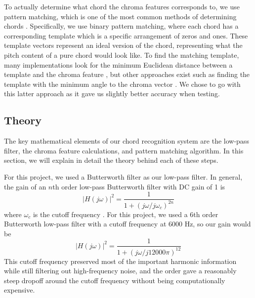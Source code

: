 \documentclass[journal]{IEEEtran}
\begin{document}
To actually determine what chord the chroma features corresponds to, we use pattern matching, which is one of the most common methods of determining chords \cite{cho_chroma}.
Specifically, we use binary pattern matching, where each chord has a corresponding template which is a specific arrangement of zeros and ones.
These template vectors represent an ideal version of the chord, representing what the pitch content of a pure chord would look like.
To find the matching template, many implementations look for the minimum Euclidean distance between a template and the chroma feature \cite{stark}, but other approaches exist such as finding the template with the minimum angle to the chroma vector \cite{jiang}.
We chose to go with this latter approach as it gave us slightly better accuracy when testing.


\subsection{Theory}
The key mathematical elements of our chord recognition system are the low-pass filter, the chroma feature calculations, and pattern matching algorithm.
In this section, we will explain in detail the theory behind each of these steps.

For this project, we used a Butterworth filter as our low-pass filter.
In general, the gain of an $n$th order low-pass Butterworth filter with DC gain of 1 is 
\begin{equation}
    |H(j\omega)|^2 = \frac{1}{1 + (j\omega/j\omega_c)^{2n}}
    \label{eq:butterworth}
\end{equation}
where $\omega_c$ is the cutoff frequency \cite{proakis}.
For this project, we used a 6th order Butterworth low-pass filter with a cutoff frequency at 6000 Hz, so our gain would be
\begin{equation*}
    |H(j\omega)|^2 = \frac{1}{1 + (j\omega/j12000\pi)^{12}}
    \label{eq:our_butterworth}
\end{equation*}
This cutoff frequency preserved most of the important harmonic information while still filtering out high-frequency noise, and the order gave a reasonably steep dropoff around the cutoff frequency without being computationally expensive.
\end{document}

